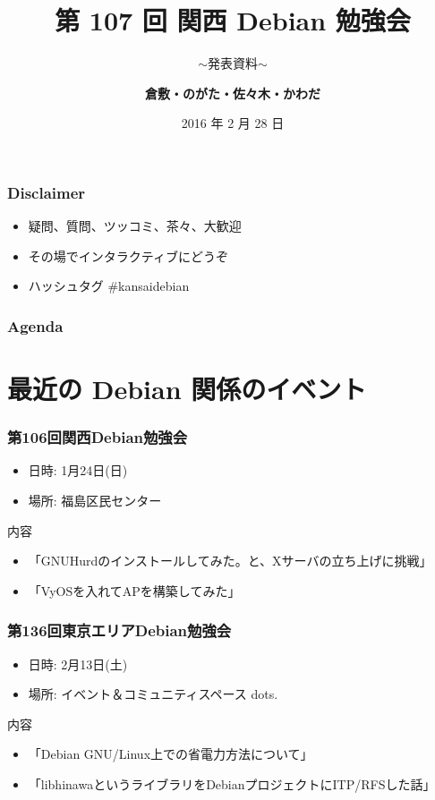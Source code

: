 \documentclass[cjk,dvipdfmx,10pt,compress,%
hyperref={bookmarks=true,bookmarksnumbered=true,bookmarksopen=false,%
colorlinks=false,%
pdftitle={第 107 回 関西 Debian 勉強会},%
pdfauthor={倉敷・のがた・佐々木・かわだ},%
pdfsubject={資料},%
}]{beamer}
\title{第 107 回 関西 Debian 勉強会}
\subtitle{$\sim$発表資料$\sim$}
\author[かわだ てつたろう]{{\large\bf 倉敷・のがた・佐々木・かわだ}}
\institute[Debian JP]{{\normalsize\tt 関西 Debian 勉強会}}
\date{{\small 2016 年 2 月 28 日}}
\begin{document}
\settitleslide
\begin{frame}
\titlepage
\end{frame}
\setdefaultslide

\begin{frame}[fragile]
  \frametitle{Disclaimer}
  \begin{itemize}
  \item 疑問、質問、ツッコミ、茶々、\alert{大歓迎}
  \item その場でインタラクティブにどうぞ
  \item ハッシュタグ \#kansaidebian
  \end{itemize}
\end{frame}

\begin{frame}[fragile]
\frametitle{Agenda}

\tableofcontents

\end{frame}

\section{最近の Debian 関係のイベント}


\begin{frame}[fragile]
  \frametitle{第106回関西Debian勉強会}
  \begin{itemize}
  \item 日時: 1月24日(日)
  \item 場所: 福島区民センター
  \end{itemize}
  \begin{block}{内容}
    \begin{itemize}
    \item 「GNUHurdのインストールしてみた。と、Xサーバの立ち上げに挑戦」
    \item 「VyOSを入れてAPを構築してみた」
    \end{itemize}
  \end{block}
\end{frame}

\begin{frame}[fragile]
  \frametitle{第136回東京エリアDebian勉強会}
  \begin{itemize}
  \item 日時: 2月13日(土)
  \item 場所: イベント＆コミュニティスペース dots.
  \end{itemize}
  \begin{block}{内容}
    \begin{itemize}
    \item 「Debian GNU/Linux上での省電力方法について」
    \item 「libhinawaというライブラリをDebianプロジェクトにITP/RFSした話」
    \end{itemize}
  \end{block}
\end{frame}
\end{document}

